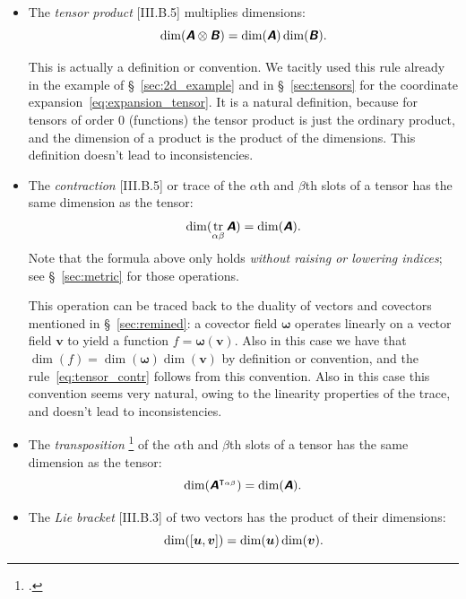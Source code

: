 \documentclass[a4paper,12pt,onecolumn,oneside,article,british]{memoir}
\newcommand*{\mathte}[1]{\textbf{\textit{\textsf{#1}}}}
\newcommand*{\citep}{\footcites}
\DeclareMathOperator{\tr}{tr}%
\DeclarePairedDelimiter\clcl{[}{]}
\newcommand*{\sect}{\S}%
\newcommand*{\yA}{\mathte{A}}
\newcommand*{\yB}{\mathte{B}}
\newcommand*{\yom}{\bm{\omega}}
\newcommand*{\yv}{\bm{v}}
\newcommand*{\yu}{\bm{u}}
\begin{document}
\begin{itemize}[wide=0pt]
\item The \emph{tensor product} [III.B.5] multiplies dimensions:
  \begin{equation}
  \dim(\yA\otimes\yB) = \dim(\yA)\dim(\yB).\label{eq:tensor_mult}
\end{equation}

This is actually a definition or convention. We tacitly used this rule
already in the example of \sect~\ref{sec:2d_example} and in
\sect~\ref{sec:tensors} for the coordinate
expansion~\eqref{eq:expansion_tensor}. It is a natural definition, because
for tensors of order 0 (functions) the tensor product is just the ordinary
product, and the dimension of a product is the product of the dimensions.
This definition doesn't lead to inconsistencies.


\item The \emph{contraction} [III.B.5] or trace of the $\alpha$th and $\beta$th
  slots of a tensor has the same dimension as the tensor:
  \begin{equation}
    \dim(\tr_{\alpha\beta}\yA) = \dim(\yA).
    \label{eq:tensor_contr}
  \end{equation}
  Note that the formula above only holds \emph{without raising or lowering
    indices}; see \sect~\ref{sec:metric} for those operations.

  This operation can be traced back to the duality of vectors and covectors
  mentioned in \sect~\ref{sec:remined}: a covector field $\yom$ operates
  linearly on a vector field $\yv$ to yield a function $f=\yom(\yv)$. Also
  in this case we have that $\dim(f)=\dim(\yom)\dim(\yv)$ by definition or
  convention, and the rule~\eqref{eq:tensor_contr} follows from this
  convention. Also in this case this convention seems very natural, owing
  to the linearity properties of the trace, and doesn't lead to
  inconsistencies.

  

\item The \emph{transposition} \citep[called \enquote{building an isomer}
  by][\sect~I.3 p.~13]{schouten1924_r1954}[\sect~II.4
  p.~20]{schouten1951_r1989} of the $\alpha$th and $\beta$th slots of a
  tensor has the same dimension as the tensor:
  \begin{equation}
    \dim(\yA^{\intercal_{\alpha\beta}}) = \dim(\yA).
    \label{eq:tensor_transp}
  \end{equation}


\item The \emph{Lie bracket} [III.B.3] of two vectors has the product of their dimensions:
  \begin{equation}
    \dim(\clcl{\yu,\yv}) =\dim(\yu)\dim(\yv).
    \label{eq:lie_bracket}
\end{equation}


\end{itemize}
\end{document}
